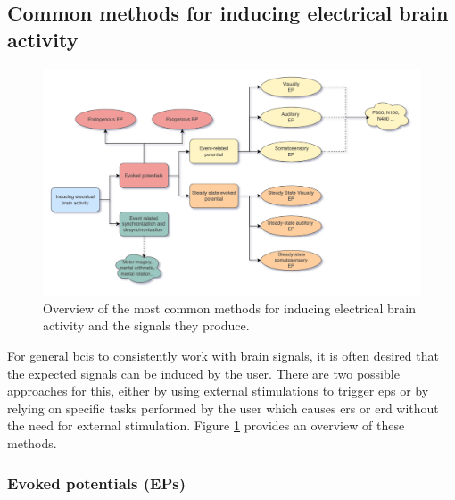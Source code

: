 
\subsection{Common methods for inducing electrical brain activity}
\label{subsec:biomedical_signals_working_with_eeg_inducing_methods}


\begin{figure}[ht]
    \centering
    \includegraphics[width=\linewidth]{../images/biosignals/brain_signal_inducing_methods.pdf}
    \captionsetup{width=0.8\linewidth}
    \captionsetup{justification=centering}
    \caption{Overview of the most common methods for inducing electrical brain activity and the signals they produce.}
    \label{fig:biomedical_signals_inducing_methods}
\end{figure}



For general \glspl{bci} to consistently work with brain signals, it is often desired that the expected signals can be induced by the user.
There are two possible approaches for this, either by using external stimulations to trigger \glspl{ep} or by relying on specific tasks performed by the user which causes \gls{ers} or \gls{erd} without the need for external stimulation.
Figure \ref{fig:biomedical_signals_inducing_methods} provides an overview of these methods.


\subsubsection{Evoked potentials (EPs)}
\label{subsubsec:biomedical_signals_working_with_eeg_inducing_methods_ep}

